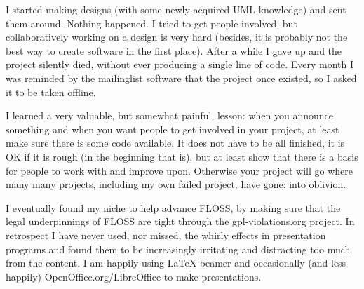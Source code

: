 I started making designs (with some newly acquired UML knowledge) and sent them
around. Nothing happened. I tried to get people involved, but collaboratively
working on a design is very hard (besides, it is probably not the best way to
create software in the first place). After a while I gave up and the project
silently died, without ever producing a single line of code. Every month I was
reminded by the mailinglist software that the project once existed, so I asked
it to be taken offline.

I learned a very valuable, but somewhat painful, lesson: when you announce
something and when you want people to get involved in your project, at least
make sure there is some code available. It does not have to be all finished, it
is OK if it is rough (in the beginning that is), but at least show that there is
a basis for people to work with and improve upon. Otherwise your project will go
where many many projects, including my own failed project, have gone: into
oblivion.

I eventually found my niche to help advance FLOSS, by making sure that the legal
underpinnings of FLOSS are tight through the gpl-violations.org project. In
retrospect I have never used, nor missed, the whirly effects in presentation
programs and found them to be increasingly irritating and distracting too much
from the content. I am happily using LaTeX beamer and occasionally (and less
happily) OpenOffice.org/LibreOffice to make presentations.
